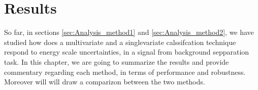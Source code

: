 \section{Results}
\label{sec:org28f7420}
So far, in sections \ref{sec:Analysis_method1} and \ref{sec:Analysis_method2}, we have studied how does a multivariate and a singlevariate calssifcation technique respond to energy scale uncertainties, in a signal from background sepparation task. In this chapter, we are going to summarize the results and provide commentary regarding each method, in terms of performance and robustness. Moreover will will draw a comparizon between the two methods.
